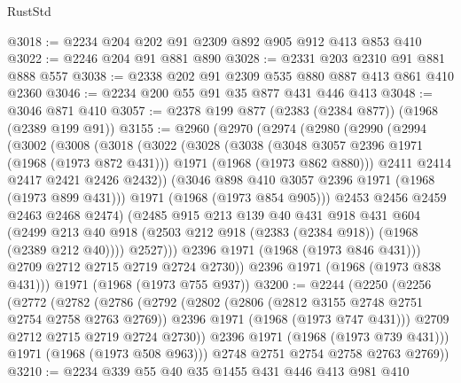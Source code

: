 \begin{lexlean}{RustStd}
\begin{coremodule}
{\begin{coremodule}
{{{{{@3018 := @2234 @204 @202 @91 @2309 @892 @905 @912 @413 @853 @410
@3022 := @2246 @204 @91 @881 @890
@3028 := @2331 @203 @2310 @91 @881 @888 @557
@3038 := @2338 @202 @91 @2309 @535 @880 @887 @413 @861 @410 @2360
@3046 := @2234 @200 @55 @91 @35 @877 @431 @446 @413
@3048 := @3046 @871 @410
@3057 := @2378 @199 @877 (@2383 (@2384 @877)) (@1968 (@2389 @199 @91))
@3155 := @2960
    (@2970
      (@2974
        (@2980
          (@2990
            (@2994
              (@3002
                (@3008
                  (@3018
                    (@3022
                      (@3028
                        (@3038
                          (@3048 @3057 @2396 @1971 (@1968 (@1973 @872 @431)))
                          @1971
                          (@1968 (@1973 @862 @880)))
                        @2411
                        @2414
                        @2417
                        @2421
                        @2426
                        @2432))
                    (@3046 @898 @410 @3057 @2396 @1971 (@1968 (@1973 @899 @431)))
                    @1971
                    (@1968 (@1973 @854 @905)))
                  @2453
                  @2456
                  @2459
                  @2463
                  @2468
                  @2474)
                (@2485
                  @915
                  @213
                  @139
                  @40
                  @431
                  @918
                  @431
                  @604
                  (@2499
                    @213
                    @40
                    @918
                    (@2503 @212 @918 (@2383 (@2384 @918)) (@1968 (@2389 @212 @40))))
                  @2527)))
            @2396
            @1971
            (@1968 (@1973 @846 @431)))
          @2709
          @2712
          @2715
          @2719
          @2724
          @2730))
      @2396
      @1971
      (@1968 (@1973 @838 @431)))
    @1971
    (@1968 (@1973 @755 @937))
@3200 := @2244
    (@2250
      (@2256
        (@2772
          (@2782
            (@2786
              (@2792
                (@2802
                  (@2806 (@2812 @3155 @2748 @2751 @2754 @2758 @2763 @2769))
                  @2396
                  @1971
                  (@1968 (@1973 @747 @431)))
                @2709
                @2712
                @2715
                @2719
                @2724
                @2730))
            @2396
            @1971
            (@1968 (@1973 @739 @431)))
          @1971
          (@1968 (@1973 @508 @963)))
        @2748
        @2751
        @2754
        @2758
        @2763
        @2769))
@3210 := @2234 @339 @55 @40 @35 @1455 @431 @446 @413 @981 @410
}}}}}
\end{coremodule}}
\end{coremodule}
\end{lexlean}
